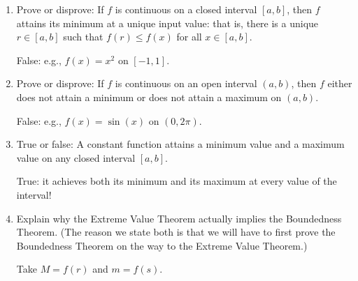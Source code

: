 \documentclass[12pt]{amsart}
\newcommand{\R}{{\mathbb{R}}}
\numberwithin{equation}{section}
\theoremstyle{plain} %
\theoremstyle{definition}
\theoremstyle{remark}
\begin{document}
\begin{enumerate}
   \item Prove or disprove: If $f$ is continuous on a closed interval $[a,b]$, then $f$ attains its minimum at a unique input value: that is, there is a unique $r\in [a,b]$ such that $f(r)\leq f(x)$ for all $x\in [a,b]$.
   
   \begin{framed}
   False: e.g., $f(x)=x^2$ on $[-1,1]$.
   \end{framed}
   
   \item Prove or disprove: If $f$ is continuous on an open interval $(a,b)$, then $f$ either does not attain a minimum or does not attain a maximum on $(a,b)$.
   
   \begin{framed}
   False: e.g., $f(x)=\sin(x)$ on $(0,2\pi)$.
   \end{framed}
   
   \item True or false: A constant function attains a minimum value and a maximum value on any closed interval $[a,b]$.
   
   \begin{framed}
   True: it achieves both its minimum and its maximum at every value of the interval!
   \end{framed}
   
   
 \item Explain why the Extreme Value Theorem actually implies the Boundedness Theorem. (The reason we state both is that we will have to first prove the Boundedness Theorem on the way to the Extreme Value Theorem.)

\begin{framed}
Take $M=f(r)$ and $m=f(s)$.
\end{framed}


   \end{enumerate}
   
\end{document}
